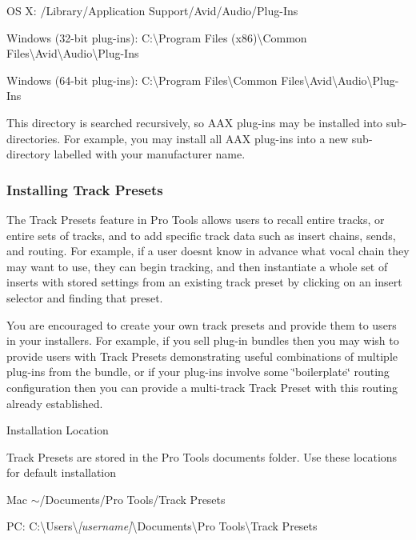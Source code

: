 \begin{DoxyItemize}
\item O\+S X\+: /\+Library/\+Application Support/\+Avid/\+Audio/\+Plug-\/\+Ins  
\item Windows (32-\/bit plug-\/ins)\+: C\+:\textbackslash{}Program Files (x86)\textbackslash{}Common Files\textbackslash{}Avid\textbackslash{}Audio\textbackslash{}Plug-\/\+Ins  
\item Windows (64-\/bit plug-\/ins)\+: C\+:\textbackslash{}Program Files\textbackslash{}Common Files\textbackslash{}Avid\textbackslash{}Audio\textbackslash{}Plug-\/\+Ins  
\end{DoxyItemize}

 This directory is searched recursively, so A\+A\+X plug-\/ins may be installed into sub-\/directories. For example, you may install all A\+A\+X plug-\/ins into a new sub-\/directory labelled with your manufacturer name.

\hypertarget{a00372_aax_distributing_installer_trackpresets}{}\subsubsection{Installing Track Presets}\label{a00372_aax_distributing_installer_trackpresets}
 The Track Presets feature in Pro Tools allows users to recall entire tracks, or entire sets of tracks, and to add specific track data such as insert chains, sends, and routing. For example, if a user doesn\textquotesingle{}t know in advance what vocal chain they may want to use, they can begin tracking, and then instantiate a whole set of inserts with stored settings from an existing track preset by clicking on an insert selector and finding that preset.

 You are encouraged to create your own track presets and provide them to users in your installers. For example, if you sell plug-\/in bundles then you may wish to provide users with Track Presets demonstrating useful combinations of multiple plug-\/ins from the bundle, or if your plug-\/ins involve some \char`\"{}boilerplate\char`\"{} routing configuration then you can provide a multi-\/track Track Preset with this routing already established.

  Installation Location

 Track Presets are stored in the Pro Tools documents folder. Use these locations for default installation

 
\begin{DoxyItemize}
\item Mac $\sim$/\+Documents/\+Pro Tools/\+Track Presets  
\item P\+C\+: C\+:\textbackslash{}Users\textbackslash{}{\itshape \mbox{[}username\mbox{]}}\textbackslash{}Documents\textbackslash{}Pro Tools\textbackslash{}Track Presets  
\end{DoxyItemize}

